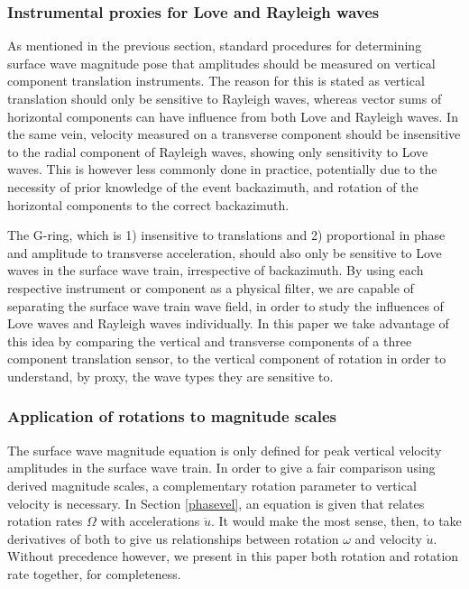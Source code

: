 \documentclass{gji}
\begin{document}
\subsubsection{Instrumental proxies for Love and Rayleigh waves}
As mentioned in the previous section, standard procedures for determining surface wave magnitude pose that amplitudes should be measured on vertical component translation instruments. The reason for this is stated as vertical translation should only be sensitive to Rayleigh waves, whereas vector sums of horizontal components can have influence from both Love and Rayleigh waves. In the same vein, velocity measured on a transverse component should be insensitive to the radial component of Rayleigh waves, showing only sensitivity to Love waves. This is however less commonly done in practice, potentially due to the necessity of prior knowledge of the event backazimuth, and rotation of the horizontal components to the correct backazimuth. 

The G-ring, which is 1) insensitive to translations and 2) proportional in phase and amplitude to transverse acceleration, should also only be sensitive to Love waves in the surface wave train, irrespective of backazimuth.  
By using each respective instrument or component as a physical filter, we are capable of separating the surface wave train wave field, in order to study the influences of Love waves and Rayleigh waves individually. In this paper we take advantage of this idea by comparing the vertical and transverse components of a three component translation sensor, to the vertical component of rotation in order to understand, by proxy, the wave types they are sensitive to.

\subsubsection{Application of rotations to magnitude scales}
The surface wave magnitude equation is only defined for peak vertical velocity amplitudes in the surface wave train. In order to give a fair comparison using derived magnitude scales, a complementary rotation parameter to vertical velocity is necessary. In Section \ref{phasevel}, an equation is given that relates rotation rates $\Omega$ with accelerations $\ddot{u}$. It would make the most sense, then, to take derivatives of both to give us relationships between rotation $\omega$ and velocity $\dot{u}$. Without precedence however, we present in this paper both rotation and rotation rate together, for completeness.
\end{document}
